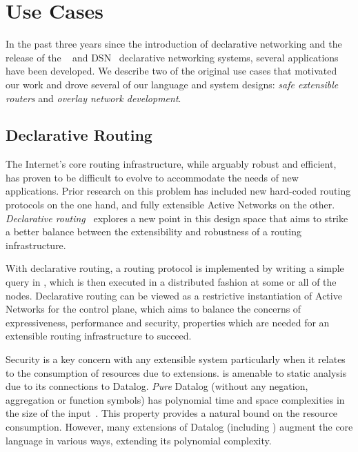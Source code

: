 \section{Use Cases}

In the past three years since the introduction of declarative
networking and the release of the \Pitu~\cite{p2} and DSN~\cite{dsn}
declarative networking systems, several applications have been
developed. We describe two of the original use cases that motivated
our work and drove several of our language and system designs: {\em
  safe extensible routers} and {\em overlay network development}.


\subsection{Declarative Routing}

The Internet's core routing infrastructure, while arguably robust and
efficient, has proven to be difficult to evolve to accommodate the
needs of new applications. Prior research on this problem has included
new hard-coded routing protocols on the one hand, and fully extensible
Active Networks on the other. {\em Declarative
  routing}~\cite{declareRoute} explores a new point in this design
space that aims to strike a better balance between the extensibility
and robustness of a routing infrastructure.

With declarative routing, a routing protocol is implemented by writing
a simple query in \Dlog, which is then executed in a distributed
fashion at some or all of the nodes. Declarative routing can be viewed
as a restrictive instantiation of Active Networks for the control
plane, which aims to balance the concerns of expressiveness,
performance and security, properties which are needed for an
extensible routing infrastructure to succeed.

Security is a key concern with any extensible system particularly when
it relates to the consumption of resources due to extensions.  \Dlog
is amenable to static analysis due to its connections to Datalog. {\em
  Pure} Datalog (without any negation, aggregation or function symbols) has
polynomial time and space complexities in the size of the
input~\cite{alicebook}. This property provides a natural bound on the
resource consumption. However, many extensions of Datalog (including
\Dlog) augment the core language in various ways,
extending its polynomial complexity.

